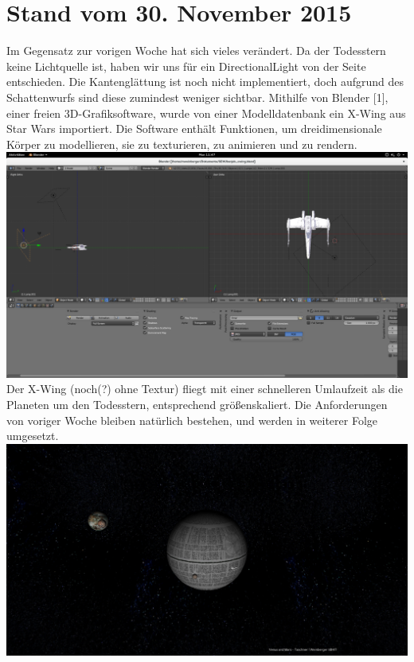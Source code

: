 \documentclass[12pt,a4paper,oneside,ngerman]{scrartcl}
\begin{document}
\section{Stand vom 30. November 2015}
Im Gegensatz zur vorigen Woche hat sich vieles verändert. Da der Todesstern keine Lichtquelle ist, haben wir uns für ein DirectionalLight von der Seite entschieden. Die Kantenglättung ist noch nicht implementiert, doch aufgrund des Schattenwurfs sind diese zumindest weniger sichtbar. Mithilfe von Blender [1], einer freien 3D-Grafiksoftware, wurde von einer Modelldatenbank ein X-Wing aus Star Wars importiert. Die Software enthält Funktionen, um dreidimensionale Körper zu modellieren, sie zu texturieren, zu animieren und zu rendern. \newline \newline
\includegraphics[width=1\textwidth]{blender_screen} \newline \newline
Der X-Wing (noch(?) ohne Textur) fliegt mit einer schnelleren Umlaufzeit als die Planeten um den Todesstern, entsprechend größenskaliert. \newline
Die Anforderungen von voriger Woche bleiben natürlich bestehen, und werden in weiterer Folge umgesetzt. \newline
\includegraphics[width=1\textwidth]{30_11_Screen_1}
\newpage
\end{document}
